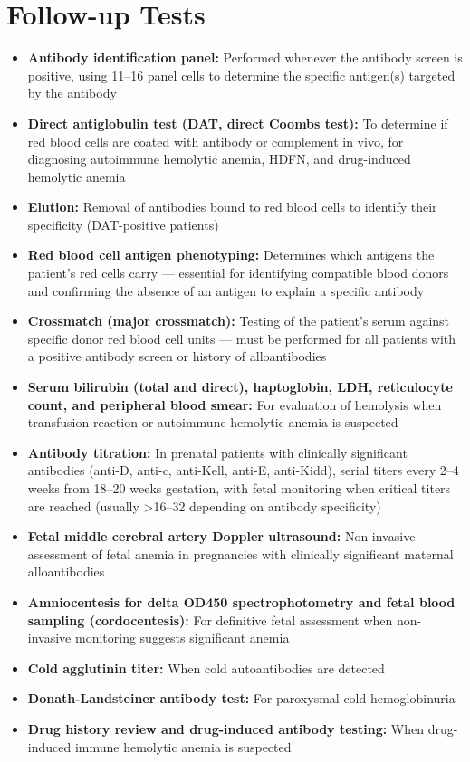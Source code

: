 \section*{Follow-up Tests}
\begin{itemize}
  \item \textbf{Antibody identification panel:} Performed whenever the antibody screen is positive, using 11--16 panel cells to determine the specific antigen(s) targeted by the antibody
  \item \textbf{Direct antiglobulin test (DAT, direct Coombs test):} To determine if red blood cells are coated with antibody or complement in vivo, for diagnosing autoimmune hemolytic anemia, HDFN, and drug-induced hemolytic anemia
  \item \textbf{Elution:} Removal of antibodies bound to red blood cells to identify their specificity (DAT-positive patients)
  \item \textbf{Red blood cell antigen phenotyping:} Determines which antigens the patient's red cells carry --- essential for identifying compatible blood donors and confirming the absence of an antigen to explain a specific antibody
  \item \textbf{Crossmatch (major crossmatch):} Testing of the patient's serum against specific donor red blood cell units --- must be performed for all patients with a positive antibody screen or history of alloantibodies
  \item \textbf{Serum bilirubin (total and direct), haptoglobin, LDH, reticulocyte count, and peripheral blood smear:} For evaluation of hemolysis when transfusion reaction or autoimmune hemolytic anemia is suspected
  \item \textbf{Antibody titration:} In prenatal patients with clinically significant antibodies (anti-D, anti-c, anti-Kell, anti-E, anti-Kidd), serial titers every 2--4 weeks from 18--20 weeks gestation, with fetal monitoring when critical titers are reached (usually >16--32 depending on antibody specificity)
  \item \textbf{Fetal middle cerebral artery Doppler ultrasound:} Non-invasive assessment of fetal anemia in pregnancies with clinically significant maternal alloantibodies
  \item \textbf{Amniocentesis for delta OD450 spectrophotometry and fetal blood sampling (cordocentesis):} For definitive fetal assessment when non-invasive monitoring suggests significant anemia
  \item \textbf{Cold agglutinin titer:} When cold autoantibodies are detected
  \item \textbf{Donath-Landsteiner antibody test:} For paroxysmal cold hemoglobinuria
  \item \textbf{Drug history review and drug-induced antibody testing:} When drug-induced immune hemolytic anemia is suspected
\end{itemize}

